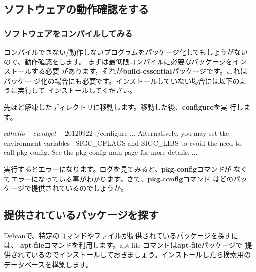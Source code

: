 \documentclass[mingoth,a4paper]{jsarticle}
\begin{document}
\subsection{ソフトウェアの動作確認をする}


\subsubsection{ソフトウェアをコンパイルしてみる}

コンパイルできない/動作しないプログラムをパッケージ化してもしょうがないので、動作確認をします。
まずは最低限コンパイルに必要なパッケージをインストールする必要
があります。それが{\bf build-essential}パッケージです。これはパッケー
ジ化の場合にも必要です。インストールしていない場合には以下のように実行して
インストールしてください。


先ほど解凍したディレクトリに移動します。移動した後、{\bf configure}を実
行します。
\begin{commandline}
$ cd hello-cwidget-20120922
$ ./configure
...
Alternatively, you may set the environment variables \
SIGC_CFLAGS
and SIGC_LIBS to avoid the need to call pkg-config.
See the pkg-config man page for more details.
...
\end{commandline}

実行するとエラーになります。ログを見てみると、{\bf pkg-config}コマンドが
なくてエラーになっている事がわかります。さて、{\bf pkg-config}コマンド
はどのパッケージで提供されているのでしょうか。

\subsection{提供されているパッケージを探す}

Debianで、特定のコマンドやファイルが提供されているパッケージを探すには、
{\bf apt-file}コマンドを利用します。apt-file コマンドは{\bf apt-file}パッケージで
提供されているのでインストールしておきましょう。インストールしたら検索用の
データベースを構築します。
\end{document}
